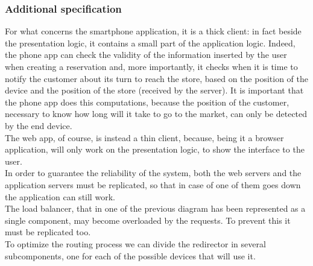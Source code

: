 \subsubsection{Additional specification}
For what concerns the smartphone application, it is a thick client: in fact beside the presentation logic, it contains a small part of the application logic. Indeed, the phone app can check the validity of the information inserted by the user when creating a reservation and, more importantly, it checks when it is time to notify the customer about its turn to reach the store, based on the position of the device and the position of the store (received by the server). It is important that the phone app does this computations, because the position of the customer, necessary to know how long will it take to go to the market, can only be detected by the end device.\\
The web app, of course, is instead a thin client, because, being it a browser application, will only work on the presentation logic, to show the interface to the user.\\
In order to guarantee the reliability of the system, both the web servers and the application servers must be replicated, so that in case of one of them goes down the application can still work.\\
The load balancer, that in one of the previous diagram has been represented as a single component, may become overloaded by the requests. To prevent this it must be replicated too.\\
To optimize the routing process we can divide the redirector in several subcomponents, one for each of the possible devices that will use it.\\
\begin{figure}[H]
	\noindent
\end{figure}

